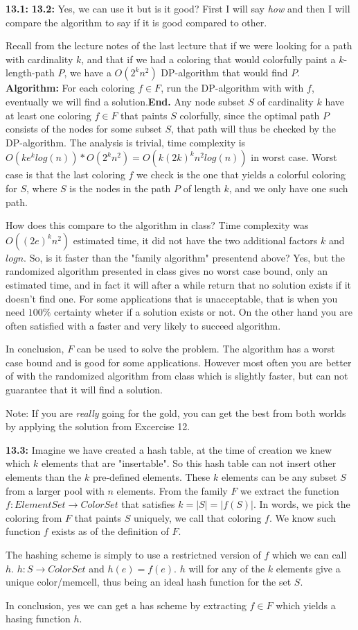 \documentclass[a4paper,11pt]{article}
\begin{document}
\textbf{13.1:}
\textbf{13.2:} Yes, we can use it but is it good?
First I will say \emph{how} and then I will compare the
algorithm to say if it is good compared to other.

Recall from the lecture notes of the last lecture that
if we were looking for a path with cardinality $k$,
and that if we had a coloring that would colorfully
paint a $k$-length-path $P$, we have a $O(2^kn^2)$ DP-algorithm
that would find $P$.
\textbf{Algorithm:} For each
coloring $f \in F$, run the DP-algorithm with
with $f$, eventually we will find a solution.\textbf{End.}
Any node subset $S$ of cardinality $k$
have at least one coloring $f \in F$ that paints $S$ colorfully,
since the optimal path $P$ consists of the nodes for some subset $S$,
that path will thus be checked by the DP-algorithm. The analysis
is trivial, time complexity is
$O(ke^klog(n))*O(2^kn^2) = O(k(2k)^kn^2log(n))$ in worst case.
Worst case is that the last coloring $f$ we check is the
one that yields a colorful coloring for $S$, where $S$ is the
nodes in the path $P$ of length $k$, and we only have one such path.

How does this compare to the algorithm in class?
Time complexity was $O((2e)^kn^2)$ estimated time,
it did not have the two additional factors $k$ and $log n$.
So, is it faster than the "family algorithm" presentend above?
Yes, but the randomized algorithm presented in class gives no
worst case bound, only an estimated time, and in fact it will
after a while return that no solution exists if it doesn't find
one. For some applications that is unacceptable, that is when
you need $100\%$ certainty wheter if a solution exists or not.
On the other hand you are often satisfied with a faster and
very likely to succeed algorithm.

In conclusion, $F$ can be used to solve the problem.
The algorithm has a worst case bound and is good for some
applications. However most often you are better of with
the randomized algorithm from class which is slightly faster,
but can not guarantee that it will find a solution.

Note: If you are \emph{really} going for the gold, you
can get the best from both worlds by applying the solution
from Excercise 12.

\textbf{13.3:} Imagine we have created a hash table,
at the time of creation we knew which $k$ elements
that are "insertable". So this hash table can not insert
other elements than the $k$ pre-defined elements.
These $k$ elements can be any subset $S$ from a larger pool
with $n$ elements. From the family $F$ we extract the function
$f : ElementSet \to ColorSet$ that satisfies $k=|S|=|f(S)|$.
In words, we pick the coloring
from $F$ that paints $S$ uniquely, we call that coloring $f$.
We know such function $f$ exists as of the definition of $F$.

The hashing scheme is simply to use a restrictned
version of $f$ which we can call $h$. $h : S \to ColorSet$
and $h(e) = f(e)$. $h$ will for any of the $k$ elements
give a unique color/memcell, thus being an ideal hash
function for the set $S$.

In conclusion, yes we can get a has scheme by extracting
$f \in F$ which yields a hasing function $h$.
\end{document}
